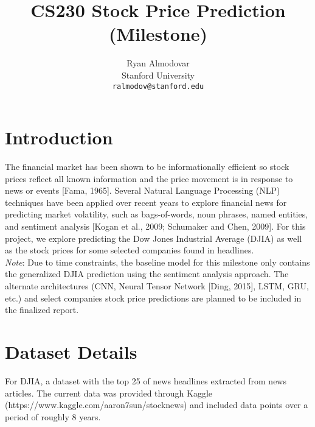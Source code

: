 \documentclass{article} %
\title{CS230 Stock Price Prediction (Milestone)}
\author{
Ryan Almodovar \\
Stanford University\\
\texttt{ralmodov@stanford.edu} \\
}
\begin{document}
\maketitle


\section{Introduction}
The financial market has been shown to be informationally efficient so stock prices reflect all known
information and the price movement is in response to news or events [Fama, 1965].  
Several Natural Language Processing (NLP) techniques have been applied over recent years to explore financial news for predicting market volatility,
such as bags-of-words, noun phrases, named entities, and sentiment analysis [Kogan et al., 2009; Schumaker and Chen, 2009].
For this project, we explore predicting the Dow Jones Industrial Average (DJIA) as well as the stock prices for some selected companies found in headlines.
\\
\textit{Note}: Due to time constraints, the baseline model for this milestone only contains the generalized DJIA prediction using the sentiment analysis approach.
The alternate architectures (CNN, Neural Tensor Network [Ding, 2015], LSTM, GRU, etc.)
and select companies stock price predictions are planned to be included in the finalized report.

\section{Dataset Details}
For DJIA, a dataset with the top 25 of news headlines extracted from news articles.
The current data was provided through Kaggle (https://www.kaggle.com/aaron7sun/stocknews) and included data points over a period of roughly 8 years.
\end{document}
